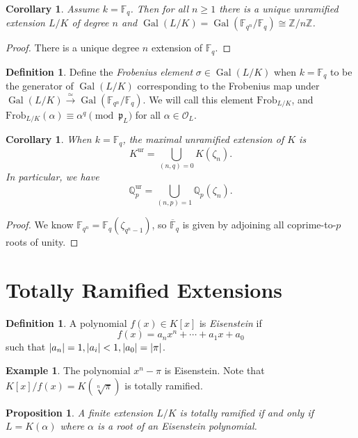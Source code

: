 \documentclass[leqno, openany]{memoir}
\newtheorem{cor}[thm]{Corollary}
\newtheorem{prop}[thm]{Proposition}
\theoremstyle{definition}
\newtheorem{defn}[thm]{Definition}
\newtheorem{exm}[thm]{Example}
\theoremstyle{remark}
\theoremstyle{plain}
\theoremstyle{definition}
\theoremstyle{remark}
\newcommand{\F}{\mathbb{F}}
\newcommand{\Z}{\mathbb{Z}}
\newcommand{\Q}{\mathbb{Q}}
\newcommand{\mc}[1]{\mathcal{#1}}
\newcommand{\mf}[1]{\mathfrak{#1}}
\newcommand{\mr}[1]{\mathrm{#1}}
\newcommand{\ol}[1]{\overline{#1}}
\DeclareMathOperator{\Gal}{Gal}
\begin{document}
\begin{cor} Assume $k = \F_q$. Then for all $n \geq 1$ there is a unique
unramified extension $L/K$ of degree $n$ and $\Gal(L/K) = \Gal(\F_{q^n} / \F_q)
\cong \Z/n\Z$.  \end{cor}

\begin{proof} There is a unique degree $n$ extension of $\F_q$.  \end{proof}

\begin{defn} Define the \textit{Frobenius element} $\sigma \in \Gal(L/K)$ when
    $k = \F_q$ to be the generator of $\Gal(L/K)$ corresponding to the
    Frobenius map under $\Gal(L/K) \xrightarrow{\simeq} \Gal(\F_{q^n} / \F_q)$.
    We will call this element $\mr{Frob}_{L/K}$, and $\mr{Frob}_{L/K}(\alpha)
    \equiv \alpha^q \pmod \mf{p}_L$ for all $\alpha \in \mc{O}_L$.  \end{defn}

\begin{cor} When $k = \F_q$, the maximal unramified extension of $K$ is \[
    K^{\mr{ur}} = \bigcup_{(n,q) = 0} K(\zeta_n). \] In particular, we have \[
\Q_p^{\mr{ur}} = \bigcup_{(n,p) = 1} \Q_p(\zeta_n). \] \end{cor}

\begin{proof} We know $\F_{q^n} = \F_q(\zeta_{q^n-1})$, so $\ol{\F}_q$ is given
by adjoining all coprime-to-$p$ roots of unity.  \end{proof}

\section{Totally Ramified Extensions}%

\begin{defn} A polynomial $f(x) \in K[x]$ is \textit{Eisenstein} if \[ f(x) =
a_n x^n + \cdots + a_1 x + a_0 \] such that $\abs{a_n} = 1, \abs{a_i} < 1,
\abs{a_0} = \abs{\pi}$.  \end{defn}

\begin{exm} The polynomial $x^n - \pi$ is Eisenstein. Note that $K[x] / f(x) =
K(\sqrt[n]{\pi})$ is totally ramified.  \end{exm}

\begin{prop} A finite extension $L/K$ is totally ramified if and only if $L =
K(\alpha)$ where $\alpha$ is a root of an Eisenstein polynomial.  \end{prop}
\end{document}
